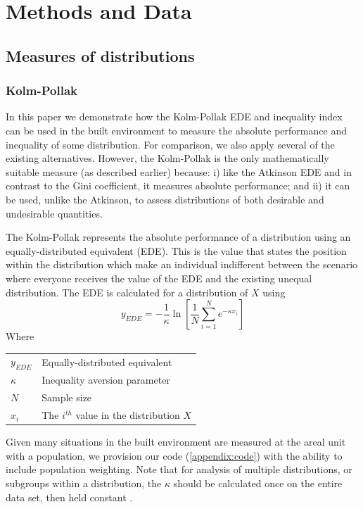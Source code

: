 \documentclass[final,3p,times,onecolumn,sort&compress]{elsarticle}
\makeatletter
\newenvironment{conditions}
  {\par\vspace{\abovedisplayskip}\noindent\begin{tabular}{>{$}l<{$} @{${}={}$} l}}
  {\end{tabular}\par\vspace{\belowdisplayskip}}
\makeatother
\begin{document}
\section{Methods and Data}
\subsection{Measures of distributions}
\subsubsection{Kolm-Pollak}
In this paper we demonstrate how the Kolm-Pollak EDE and inequality index can be used in the built environment to measure the absolute performance and inequality of some distribution.
For comparison, we also apply several of the existing alternatives. 
However, the Kolm-Pollak is the only mathematically suitable measure (as described earlier) because: i) like the Atkinson EDE and in contrast to the Gini coefficient, it measures absolute performance; and ii) it can be used, unlike the Atkinson, to assess distributions of both desirable and undesirable quantities.

The Kolm-Pollak represents the absolute performance of a distribution using an equally-distributed equivalent (EDE).
This is the value that states the position within the distribution which make an individual indifferent between the scenario where everyone receives the value of the EDE and the existing unequal distribution.
The EDE is calculated for a distribution of $X$ using \citep{Sheriff2020-ge}
\begin{equation}
    y_{EDE} = -\frac{1}{\kappa} \ln \left[ \frac{1}{N} \sum_{i=1}^{N} e ^ {-\kappa x_i} \right]
\end{equation}
Where
\begin{conditions}
     y_{EDE}  & Equally-distributed equivalent\\
     \kappa &  Inequality aversion parameter \\   
     N & Sample size \\   
     x_i & The $i^{th}$ value in the distribution $X$ \\
\end{conditions}
Given many situations in the built environment are measured at the areal unit with a population, we provision our code (\ref{appendix:code}) with the ability to include population weighting.
Note that for analysis of multiple distributions, or subgroups within a distribution, the $\kappa$ should be calculated once on the entire data set, then held constant \citep{Sheriff2020-ge}.
\end{document}
